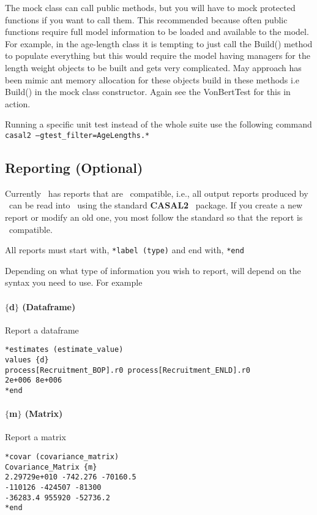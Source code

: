 The mock class can call public methods, but you will have to mock protected functions if you want to call them. This recommended because often public functions require full model information to be loaded and available to the model. For example, in the age-length class it is tempting to just call the Build() method to populate everything but this would require the model having managers for the length weight objects to be built and gets very complicated. May approach has been mimic ant memory allocation for these objects build in these methods i.e Build() in the mock class constructor. Again see the VonBertTest for this in action.

Running a specific unit test instead of the whole suite use the following command \texttt{casal2 --gtest\_filter=AgeLengths.*}


\subsection{Reporting (Optional)}

Currently \CNAME\ has reports that are \R\ compatible, i.e., all output reports produced by \CNAME\ can be read into \R\ using the standard  \textbf{CASAL2} \R\ package. If you create a new report or modify an old one, you most follow the standard so that the report is \R\ compatible.

All reports must start with,
\texttt{*label (type)}
and end with,
\texttt{*end}

Depending on what type of information you wish to report, will depend on the syntax you need to use. For example

\paragraph*{$\{$d$\}$ (Dataframe)}
Report a dataframe
{\small{\begin{verbatim}
*estimates (estimate_value)
values {d}
process[Recruitment_BOP].r0 process[Recruitment_ENLD].r0 
2e+006 8e+006
*end
\end{verbatim}}}

\paragraph*{$\{$m$\}$ (Matrix)}
Report a matrix
{\small{\begin{verbatim}
*covar (covariance_matrix)
Covariance_Matrix {m}
2.29729e+010 -742.276 -70160.5
-110126 -424507 -81300 
-36283.4 955920 -52736.2 
*end
\end{verbatim}}}

